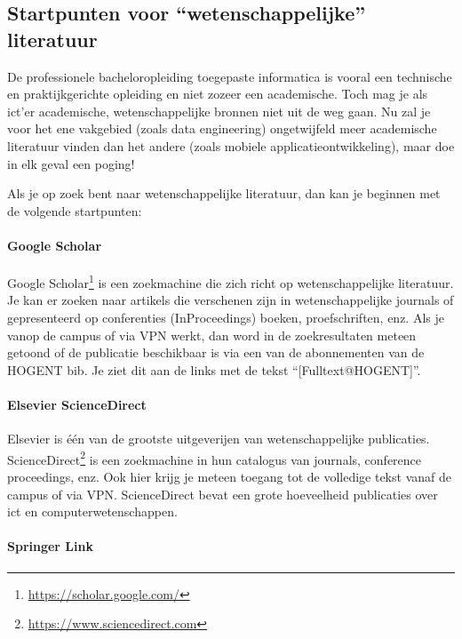 \subsection{Startpunten voor ``wetenschappelijke'' literatuur}%
\label{ssec:startpunten-wetenschappelijke-literatuur}

De professionele bacheloropleiding toegepaste informatica is vooral een technische en praktijkgerichte opleiding en niet zozeer een academische. Toch mag je als ict'er academische, wetenschappelijke bronnen niet uit de weg gaan. Nu zal je voor het ene vakgebied (zoals data engineering) ongetwijfeld meer academische literatuur vinden dan het andere (zoals mobiele applicatieontwikkeling), maar doe in elk geval een poging!

Als je op zoek bent naar wetenschappelijke literatuur, dan kan je beginnen met de volgende startpunten:

\paragraph{Google Scholar}

Google Scholar\footnote{\url{https://scholar.google.com/}} is een zoekmachine die zich richt op wetenschappelijke literatuur. Je kan er zoeken naar artikels die verschenen zijn in wetenschappelijke journals of gepresenteerd op conferenties (InProceedings) boeken, proefschriften, enz. Als je vanop de campus of via VPN werkt, dan word in de zoekresultaten meteen getoond of de publicatie beschikbaar is via een van de abonnementen van de HOGENT bib. Je ziet dit aan de links met de tekst ``[Fulltext@HOGENT]''.

\paragraph{Elsevier ScienceDirect}

Elsevier is één van de grootste uitgeverijen van wetenschappelijke publicaties. ScienceDirect\footnote{\url{https://www.sciencedirect.com}} is een zoekmachine in hun catalogus van journals, conference proceedings, enz. Ook hier krijg je meteen toegang tot de volledige tekst vanaf de campus of via VPN. ScienceDirect bevat een grote hoeveelheid publicaties over ict en computerwetenschappen.

\paragraph{Springer Link}

